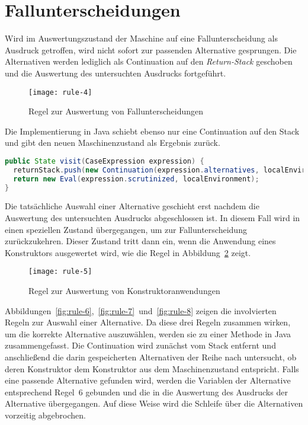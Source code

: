 \section{Fallunterscheidungen}


Wird im Auswertungszustand der Maschine auf eine Fallunterscheidung als Ausdruck getroffen, wird nicht sofort zur passenden Alternative gesprungen.
Die Alternativen werden lediglich als Continuation auf den \textit{Return-Stack} geschoben und die Auswertung des untersuchten Ausdrucks fortgeführt.

\begin{figure}[h]
  \centering
  \texttt{[image: rule-4]}
  \caption{Regel zur Auswertung von Fallunterscheidungen}\label{fig:rule-4}
\end{figure}

Die Implementierung in Java schiebt ebenso nur eine Continuation auf den Stack und gibt den neuen Maschinenzustand als Ergebnis zurück.

\begin{lstlisting}[language=java]
public State visit(CaseExpression expression) {
  returnStack.push(new Continuation(expression.alternatives, localEnvironment));
  return new Eval(expression.scrutinized, localEnvironment);
}
\end{lstlisting}

Die tatsächliche Auswahl einer Alternative geschieht erst nachdem die Auswertung des untersuchten Ausdrucks abgeschlossen ist.
In diesem Fall wird in einen speziellen Zustand übergegangen, um zur Fallunterscheidung zurückzukehren.
Dieser Zustand tritt dann ein, wenn die Anwendung eines Konstruktors ausgewertet wird, wie die Regel in Abbildung~\ref{fig:rule-5} zeigt.

\begin{figure}[h]
  \centering
  \texttt{[image: rule-5]}
  \caption{Regel zur Auswertung von Konstruktoranwendungen}\label{fig:rule-5}
\end{figure}

Abbildungen~\ref{fig:rule-6},~\ref{fig:rule-7}~und~\ref{fig:rule-8} zeigen die involvierten Regeln zur Auswahl einer Alternative.
Da diese drei Regeln zusammen wirken, um die korrekte Alternative auszuwählen, werden sie zu einer Methode in Java zusammengefasst.
Die Continuation wird zunächst vom Stack entfernt und anschließend die darin gespeicherten Alternativen der Reihe nach untersucht, ob deren Konstruktor dem Konstruktor aus dem Maschinenzustand entspricht.
Falls eine passende Alternative gefunden wird, werden die Variablen der Alternative entsprechend Regel~6 gebunden und die in die Auswertung des Ausdrucks der Alternative übergegangen.
Auf diese Weise wird die Schleife über die Alternativen vorzeitig abgebrochen.

